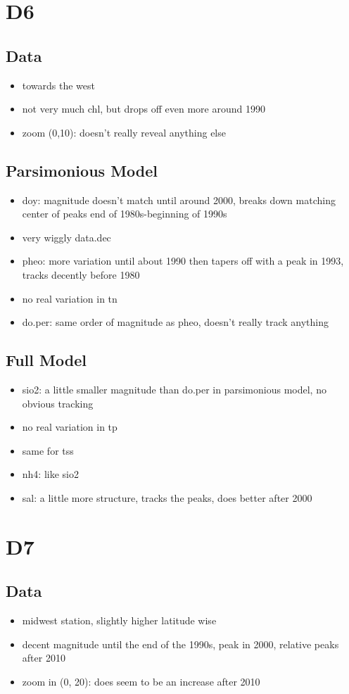 \documentclass[12pt]{amsart}
\begin{document}
\section{D6}
\subsection{Data}
\begin{itemize}
\item towards the west
\item not very much chl, but drops off even more around 1990
\item zoom (0,10): doesn't really reveal anything else
\end{itemize}
\subsection{Parsimonious Model}
\begin{itemize}
\item doy: magnitude doesn't match until around 2000, breaks down matching center of peaks end of 1980s-beginning of 1990s
\item very wiggly data.dec
\item pheo: more variation until about 1990 then tapers off with a peak in 1993, tracks decently before 1980
\item no real variation in tn
\item do.per: same order of magnitude as pheo, doesn't really track anything
\end{itemize}
\subsection{Full Model}
\begin{itemize}
\item sio2: a little smaller magnitude than do.per in parsimonious model, no obvious tracking
\item no real variation in tp
\item same for tss
\item nh4: like sio2
\item sal: a little more structure, tracks the peaks, does better after 2000
\end{itemize}


\section{D7}
\subsection{Data}
\begin{itemize}
\item midwest station, slightly higher latitude wise
\item decent magnitude until the end of the 1990s, peak in 2000, relative peaks after 2010
\item zoom in (0, 20): does seem to be an increase after 2010
\end{itemize}
\end{document}
